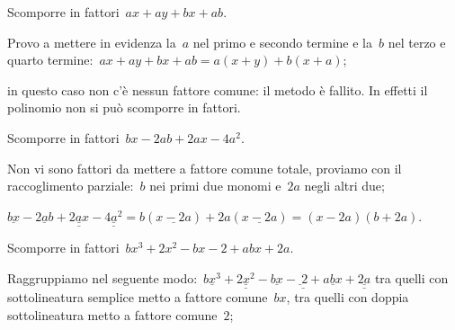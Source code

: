 \begin{exrig}
 \begin{esempio}
Scomporre in fattori~$ax+ay+bx+ab$.
  \begin{enumeratea}
  \item Provo a mettere in evidenza la~$a$ nel primo e secondo termine e la~$b$ nel terzo e quarto termine:~$ax+ay+bx+ab=a(x+y)+b(x+a)$;
  \item in questo caso non c'è nessun fattore comune: il metodo è fallito. In effetti il polinomio non si può scomporre in fattori.
  \end{enumeratea}
 \end{esempio}

 \begin{esempio}
Scomporre in fattori~$bx-2ab+2ax-4a^{2}$.
 \begin{enumeratea}
 \item Non vi sono fattori da mettere a fattore comune totale, proviamo con il raccoglimento parziale:~$b$ nei primi due monomi e~$2a$ negli altri due;
 \item %
$\underline{bx} -\underline{2ab}+\underline{\underline{2ax}}-\underline{\underline{4a^{2}}}=b(\underline{x-2a})+2a(\underline{x-2a})=(x-2a)(b+2a)$.
 \end{enumeratea}
 \end{esempio}

 \begin{esempio}
Scomporre in fattori~$bx^{3}+2x^{2}-bx-2+abx+2a$.
 \begin{enumeratea}


\item Raggruppiamo nel seguente modo:~$\underline{bx^{3}}+\underline{\underline {2x^{2}}}-\underline{bx}-\underline{\underline~2}
     +\underline{abx}+\underline{\underline{2a}}$ tra quelli con sottolineatura semplice metto a fattore comune~$bx$, tra quelli
     con doppia sottolineatura metto a fattore comune~$2$;


\end{enumeratea}
\end{esempio}
\end{exrig}
